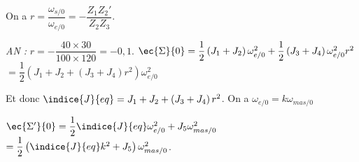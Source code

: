 \begin{corrigebox}
On a $r = \dfrac{\omega_{s/0}}{\omega_{e/0}} = - \dfrac{Z_1 Z_2'}{Z_2 Z_3} $.

\textit{AN :} $r =  - \dfrac{40 \times 30}{100 \times 120}  = -0,1$.
$\ec{\Sigma}{0} = \dfrac{1}{2}\left( J_1 + J_2 \right) \omega_{e/0}^2 + \dfrac{1}{2}\left( J_3 + J_4 \right) \omega_{e/0}^2r^2 $
$= \dfrac{1}{2}\left(  J_1 + J_2  + \left( J_3 + J_4 \right)r^2  \right)\omega_{e/0}^2$

Et donc $\indice{J}{eq}= J_1 + J_2  + \left( J_3 + J_4 \right)r^2 $.
On a $\omega_{e/0} = k \omega_{mas/0}$

$\ec{\Sigma'}{0} = \dfrac{1}{2}\indice{J}{eq} \omega_{e/0}^2 + J_5 \omega_{mas/0}^2$
$=\dfrac{1}{2}\left(\indice{J}{eq} k^2 + J_5\right) \omega_{mas/0}^2$.
\end{corrigebox}

